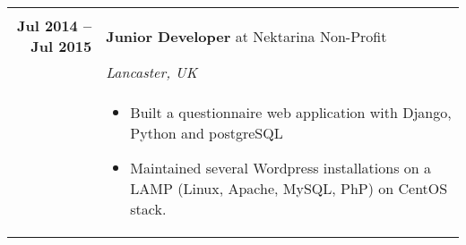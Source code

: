 \documentclass[a4paper,10pt]{article} %
\begin{document}
\begin{tabularx}{\textwidth}{r|X}
\multicolumn{2}{r}{} \\ %

\textbf{Jul 2014 -- Jul 2015}     & \textbf{Junior Developer} at {Nektarina Non-Profit}\\
                                    & \emph{Lancaster, UK}\\
                                    & \footnotesize
    {\begin{itemize}
    \item Built a questionnaire web application with Django, Python and postgreSQL
    \item Maintained several Wordpress installations on a LAMP (Linux, Apache,
    MySQL, PhP) on CentOS stack.
    \end{itemize}}\\

\end{tabularx}

\end{document}

